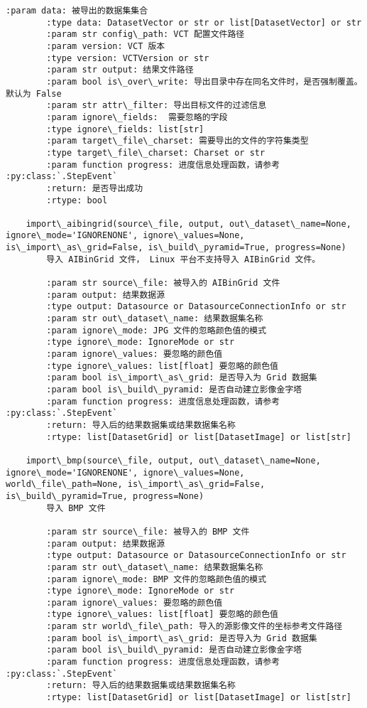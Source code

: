 \documentclass[11pt]{article}
\begin{document}
\begin{Verbatim}[commandchars=\\\{\}]
        :param data: 被导出的数据集集合
        :type data: DatasetVector or str or list[DatasetVector] or str
        :param str config\_path: VCT 配置文件路径
        :param version: VCT 版本
        :type version: VCTVersion or str
        :param str output: 结果文件路径
        :param bool is\_over\_write: 导出目录中存在同名文件时，是否强制覆盖。默认为 False
        :param str attr\_filter: 导出目标文件的过滤信息
        :param ignore\_fields:  需要忽略的字段
        :type ignore\_fields: list[str]
        :param target\_file\_charset: 需要导出的文件的字符集类型
        :type target\_file\_charset: Charset or str
        :param function progress: 进度信息处理函数，请参考 :py:class:`.StepEvent`
        :return: 是否导出成功
        :rtype: bool
    
    import\_aibingrid(source\_file, output, out\_dataset\_name=None, ignore\_mode='IGNORENONE', ignore\_values=None, is\_import\_as\_grid=False, is\_build\_pyramid=True, progress=None)
        导入 AIBinGrid 文件， Linux 平台不支持导入 AIBinGrid 文件。
        
        :param str source\_file: 被导入的 AIBinGrid 文件
        :param output: 结果数据源
        :type output: Datasource or DatasourceConnectionInfo or str
        :param str out\_dataset\_name: 结果数据集名称
        :param ignore\_mode: JPG 文件的忽略颜色值的模式
        :type ignore\_mode: IgnoreMode or str
        :param ignore\_values: 要忽略的颜色值
        :type ignore\_values: list[float] 要忽略的颜色值
        :param bool is\_import\_as\_grid: 是否导入为 Grid 数据集
        :param bool is\_build\_pyramid: 是否自动建立影像金字塔
        :param function progress: 进度信息处理函数，请参考 :py:class:`.StepEvent`
        :return: 导入后的结果数据集或结果数据集名称
        :rtype: list[DatasetGrid] or list[DatasetImage] or list[str]
    
    import\_bmp(source\_file, output, out\_dataset\_name=None, ignore\_mode='IGNORENONE', ignore\_values=None, world\_file\_path=None, is\_import\_as\_grid=False, is\_build\_pyramid=True, progress=None)
        导入 BMP 文件
        
        :param str source\_file: 被导入的 BMP 文件
        :param output: 结果数据源
        :type output: Datasource or DatasourceConnectionInfo or str
        :param str out\_dataset\_name: 结果数据集名称
        :param ignore\_mode: BMP 文件的忽略颜色值的模式
        :type ignore\_mode: IgnoreMode or str
        :param ignore\_values: 要忽略的颜色值
        :type ignore\_values: list[float] 要忽略的颜色值
        :param str world\_file\_path: 导入的源影像文件的坐标参考文件路径
        :param bool is\_import\_as\_grid: 是否导入为 Grid 数据集
        :param bool is\_build\_pyramid: 是否自动建立影像金字塔
        :param function progress: 进度信息处理函数，请参考 :py:class:`.StepEvent`
        :return: 导入后的结果数据集或结果数据集名称
        :rtype: list[DatasetGrid] or list[DatasetImage] or list[str]
    

\end{Verbatim}
\end{document}
